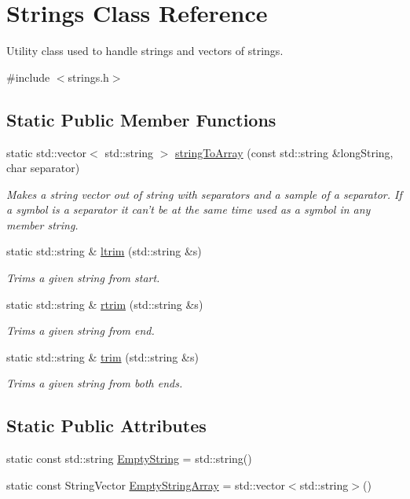 \hypertarget{class_strings}{\section{\-Strings \-Class \-Reference}
\label{class_strings}
}


\-Utility class used to handle strings and vectors of strings.  




{\ttfamily \#include $<$strings.\-h$>$}

\subsection*{\-Static \-Public \-Member \-Functions}
\begin{DoxyCompactItemize}
\item 
static std\-::vector$<$ std\-::string $>$ \hyperlink{class_strings_a0eedb78d3b12658ebaa8b60136e8fc7e}{string\-To\-Array} (const std\-::string \&long\-String, char separator)
\begin{DoxyCompactList}\small\item\em \-Makes a string vector out of string with separators and a sample of a separator. \-If a symbol is a separator it can't be at the same time used as a symbol in any member string. \end{DoxyCompactList}\item 
static std\-::string \& \hyperlink{class_strings_a98c86bfdd96ef2ea86f7c6eac43bf583}{ltrim} (std\-::string \&s)
\begin{DoxyCompactList}\small\item\em \-Trims a given string from start. \end{DoxyCompactList}\item 
static std\-::string \& \hyperlink{class_strings_a1b346c44599dbf886e86a5fa508dfb0a}{rtrim} (std\-::string \&s)
\begin{DoxyCompactList}\small\item\em \-Trims a given string from end. \end{DoxyCompactList}\item 
static std\-::string \& \hyperlink{class_strings_a4c17187355f77ffd9116024b792327ef}{trim} (std\-::string \&s)
\begin{DoxyCompactList}\small\item\em \-Trims a given string from both ends. \end{DoxyCompactList}\end{DoxyCompactItemize}
\subsection*{\-Static \-Public \-Attributes}
\begin{DoxyCompactItemize}
\item 
static const std\-::string \hyperlink{class_strings_a9069eb99db3a03a96acb5824d306ff53}{\-Empty\-String} = std\-::string()
\item 
static const \-String\-Vector \hyperlink{class_strings_a955ff72272619b3edbd2458c0371f98f}{\-Empty\-String\-Array} = std\-::vector$<$std\-::string$>$()
\end{DoxyCompactItemize}


